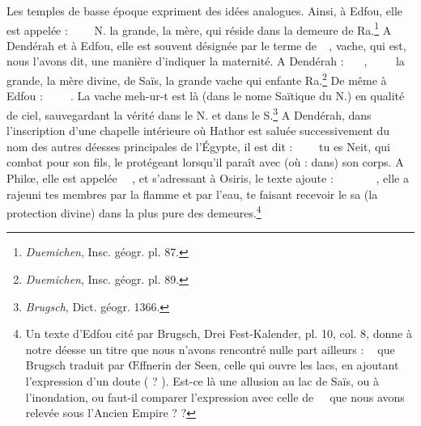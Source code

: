 \documentclass[letterpaper,twocolumn,openany,nodeprecatedcode]{dndbook}
\newcommand*\hieroAAAC{}
\newcommand*\hieroAAAD{}
\newcommand*\hieroAAAH{}
\newcommand*\hieroAAAW{\raisebox{0.5ex}{}}
\newcommand*\hieroAAAZ{}
\newcommand*\hieroAABB{}
\newcommand*\hieroAABC{\raisebox{0.5ex}{}}
\newcommand*\hieroAABE{}
\newcommand*\hieroAABR{}
\newcommand*\hieroAACB{\raisebox{0.5ex}{}}
\newcommand*\hieroAACS{}
\newcommand*\hieroAADR{}
\newcommand*\hieroAADV{\raisebox{0.5ex}{}}
\newcommand*\hieroAAEQ{}
\newcommand*\hieroAAHY{}
\newcommand*\hieroAAII{}
\newcommand*\hieroAAIM{}
\newcommand*\hieroAAKO{}
\newcommand*\hieroAALA{}
\newcommand*\hieroAALU{\raisebox{0.5ex}{}}
\newcommand*\hieroAAMZ{}
\newcommand*\hieroAANB{}
\newcommand*\hieroAANC{}
\newcommand*\hieroAANE{}
\newcommand*\hieroAASS{\raisebox{0.3ex}{}}
\newcommand*\hieroAATO{}
\newcommand*\hieroAAVX{\raisebox{0.5ex}{}}
\newcommand*\hieroAAXQ{\raisebox{0.5ex}{}}
\newcommand*\hieroAAXR{}
\newcommand*\hieroAAZI{}
\newcommand*\hieroAAZL{}
\newcommand*\hieroAAZM{}
\newcommand*\hieroAAZN{}
\newcommand*\hieroAAZO{\raisebox{0.5ex}{}}
\newcommand*\hieroAAZP{}
\newcommand*\hieroAAZQ{}
\newcommand*\hieroAAZR{}
\newcommand*\hieroAAZS{}
\newcommand*\hieroAAZT{}
\newcommand*\hieroAAZU{}
\newcommand*\hieroAAZV{}
\newcommand*\hieroAAZW{}
\newcommand*\hieroAAZX{\raisebox{0.3ex}{}}
\newcommand*\hieroAAZY{}
\newcommand*\hieroAAZZ{}
\newcommand*\hieroABAA{}
\newcommand*\hieroABAB{}
\newcommand*\hieroABAC{}
\newcommand*\hieroABAD{}
\newcommand*\hieroABAE{}
\newcommand*\hieroABAF{}
\newcommand*\hieroABAG{}
\newcommand*\hieroABAH{}
\newcommand*\hieroABAI{}
\newcommand*\hieroABAJ{}
\newcommand*\hieroABAK{}
\newcommand*\hieroABAL{}
\begin{document}
Les temples de basse époque expriment des idées analogues. Ainsi, à Edfou, elle est appelée : $\hieroAAAZ\:\hieroAAZL\:\hieroAAKO\allowbreak\:\hieroAAZM\:\hieroAADR\allowbreak\:\hieroAAXQ\:\hieroAAHY\:\hieroAAAC$ N. la grande, la mère, qui réside dans la demeure de Ra.\footnote{\emph{Duemichen}, Insc. géogr. pl. 87.} A Dendérah et à Edfou, elle est souvent désignée par le terme de $\hieroAAAH\:\hieroAALU\allowbreak\:\hieroAANB\:\hieroAAII$, vache, qui est, nous l'avons dit, une manière d'indiquer la maternité. A Dendérah : $\hieroAAAZ\:\hieroAAMZ\:\hieroAABB\allowbreak\:\hieroAANB\:\hieroAAAD\allowbreak\:\hieroAAEQ\:\hieroAAAW$, $\hieroAAAH\:\hieroAALU\:\hieroAAII\allowbreak\:\hieroAAZI\:\hieroAACB\:\hieroAANC\allowbreak\:\hieroAACS\:\hieroAAZN\:\hieroAAZO$ la grande, la mère divine, de Saïs, la grande vache qui enfante Ra.\footnote{\emph{Duemichen}, Insc. géogr. pl. 89.} De même à Edfou : $\hieroAANE\:\hieroAAZP\:\hieroAANB\allowbreak\:\hieroAAZQ\:\hieroAAZR\:\hieroAAZS\allowbreak\:\hieroAAZT\:\hieroAADV\allowbreak\:\hieroAAZU\:\hieroAABE$. La vache meh-ur-t est là (dans le nome Saïtique du N.) en qualité de ciel, sauvegardant la vérité dans le N. et dans le S.\footnote{\emph{Brugsch}, Dict. géogr. 1366.} A Dendérah, dans l'inscription d'une chapelle intérieure où Hathor est saluée successivement du nom des autres déesses principales de l'Égypte, il est dit : $\hieroAAZV\:\hieroAAZW\:\hieroAAZX\allowbreak\:\hieroAAZY\:\hieroAAZZ\:\hieroABAA\allowbreak\:\hieroAABR\:\hieroABAB$ tu es Neit, qui combat pour son fils, le protégeant lorsqu'il paraît avec (où : dans) son corps. A Philœ, elle est appelée $\hieroAAAZ\:\hieroAAXQ\:\hieroAAII\allowbreak\:\hieroAABC\:\hieroAAXR$, et s'adressant à Osiris, le texte ajoute : $\hieroABAC\:\hieroAAIM\:\hieroABAD\allowbreak\:\hieroABAE\:\hieroABAF\:\hieroABAG\:\hieroABAH\:\hieroAAVX\:\hieroABAI\allowbreak\:\hieroAATO\:\hieroAALA\:\hieroAADV\allowbreak\:\hieroABAJ\:\hieroAAHY\allowbreak\:\hieroAAHY\:\hieroAAHY$, elle a rajeuni tes membres par la flamme et par l'eau, te faisant recevoir le sa (la protection divine) dans la plus pure des demeures.\footnote{Un texte d'Edfou cité par Brugsch, Drei Fest-Kalender, pl. 10, col. 8, donne à notre déesse un titre que nous n'avons rencontré nulle part ailleurs : $\hieroAAAZ\:\hieroAASS\:\hieroABAK$ que Brugsch traduit par Œffnerin der Seen, celle qui ouvre les lacs, en ajoutant l'expression d'un doute ( ? ). Est-ce là une allusion au lac de Saïs, ou à l'inondation, ou faut-il comparer l'expression avec celle de $\hieroAASS\:\hieroABAL\allowbreak\:\hieroABAL\:\hieroABAL$ que nous avons relevée sous l'Ancien Empire ? ?}
\end{document}
